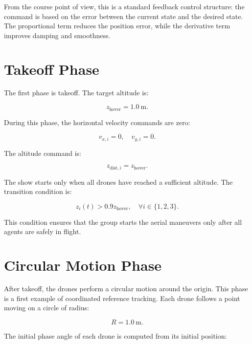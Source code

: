 From the course point of view, this is a standard feedback control structure: the command is based on the error between the current state and the desired state. The proportional term reduces the position error, while the derivative term improves damping and smoothness.

\section{Takeoff Phase}

The first phase is takeoff. The target altitude is:

\begin{equation}
    z_{\text{hover}}=1.0 \ \text{m}.
\end{equation}

During this phase, the horizontal velocity commands are zero:

\begin{equation}
    v_{x,i}=0, \quad v_{y,i}=0.
\end{equation}

The altitude command is:

\begin{equation}
    z_{\text{dist},i}=z_{\text{hover}}.
\end{equation}

The show starts only when all drones have reached a sufficient altitude. The transition condition is:

\begin{equation}
    z_i(t)>0.9z_{\text{hover}}, \quad \forall i\in\{1,2,3\}.
\end{equation}

This condition ensures that the group starts the aerial maneuvers only after all agents are safely in flight.

\section{Circular Motion Phase}

After takeoff, the drones perform a circular motion around the origin. This phase is a first example of coordinated reference tracking. Each drone follows a point moving on a circle of radius:

\begin{equation}
    R=1.0 \ \text{m}.
\end{equation}

The initial phase angle of each drone is computed from its initial position:

